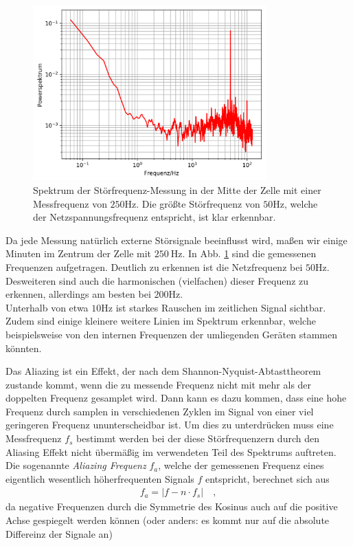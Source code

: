 \documentclass[12pt,a4paper,titlepage,headinclude]{scrartcl}
\numberwithin{equation}{subsection}
\begin{document}
\begin{figure}[!ht]
\centering
\includegraphics[width=0.8\textwidth]{stoer.png}
\caption{Spektrum der Störfrequenz-Messung in der Mitte der Zelle mit einer Messfrequenz von $250\si{\hertz}$. Die größte Störfrequenz von $50\si{\hertz}$, welche der Netzspannungsfrequenz entspricht, ist klar erkennbar.}
\label{fig:stoer}
\end{figure}

Da jede Messung natürlich externe Störsignale beeinflusst wird, maßen wir einige Minuten im Zentrum der Zelle mit $\SI{250}\hertz$.
In Abb. \ref{fig:stoer} sind die gemessenen Frequenzen aufgetragen.
Deutlich zu erkennen ist die Netzfrequenz bei $50\si{\hertz}$.
Desweiteren sind auch die harmonischen (vielfachen) dieser Frequenz zu erkennen, allerdings am besten bei $200\si{\hertz}$.\\
Unterhalb von etwa $10\si{\hertz}$ ist starkes Rauschen im zeitlichen Signal sichtbar.
Zudem sind einige kleinere weitere Linien im Spektrum erkennbar, welche beispielsweise von den internen Frequenzen der umliegenden Geräten stammen könnten.

Das Aliazing ist ein Effekt, der nach dem Shannon-Nyquist-Abtasttheorem zustande kommt, wenn die zu messende Frequenz nicht mit mehr als der doppelten Frequenz gesamplet wird.
Dann kann es dazu kommen, dass eine hohe Frequenz durch samplen in verschiedenen Zyklen im Signal von einer viel geringeren Frequenz ununterscheidbar ist.
Um dies zu unterdrücken muss eine Messfrequenz $f_s$ bestimmt werden bei der diese Störfrequenzern durch den Aliasing Effekt nicht übermäßig im verwendeten Teil des Spektrums auftreten.
Die sogenannte \textit{Aliazing Frequenz} $f_a$, welche der gemessenen Frequenz eines eigentlich wesentlich höherfrequenten Signals $f$ entspricht, berechnet sich aus
\begin{align}
  f_a=|f-n\cdot f_s|\quad,
  \label{eq:stoerfreq}
\end{align}
da negative Frequenzen durch die Symmetrie des Kosinus auch auf die positive Achse gespiegelt werden können (oder anders: es kommt nur auf die absolute Differeinz der Signale an)
\end{document}

